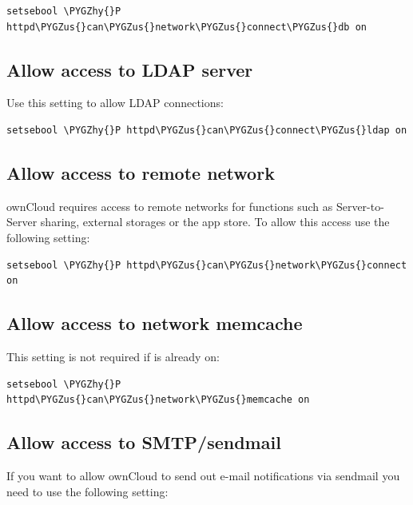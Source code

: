 \documentclass[letterpaper,10pt,english]{sphinxmanual}
\def\PYGZus{\char`\_}
\def\PYGZhy{\char`\-}
\begin{document}
\begin{Verbatim}[commandchars=\\\{\}]
setsebool \PYGZhy{}P httpd\PYGZus{}can\PYGZus{}network\PYGZus{}connect\PYGZus{}db on
\end{Verbatim}


\subsection{Allow access to LDAP server}
\label{installation/selinux_configuration:allow-access-to-ldap-server}
Use this setting to allow LDAP connections:

\begin{Verbatim}[commandchars=\\\{\}]
setsebool \PYGZhy{}P httpd\PYGZus{}can\PYGZus{}connect\PYGZus{}ldap on
\end{Verbatim}


\subsection{Allow access to remote network}
\label{installation/selinux_configuration:allow-access-to-remote-network}
ownCloud requires access to remote networks for functions such as Server-to-Server sharing, external storages or
the app store. To allow this access use the following setting:

\begin{Verbatim}[commandchars=\\\{\}]
setsebool \PYGZhy{}P httpd\PYGZus{}can\PYGZus{}network\PYGZus{}connect on
\end{Verbatim}


\subsection{Allow access to network memcache}
\label{installation/selinux_configuration:allow-access-to-network-memcache}
This setting is not required if  is already on:

\begin{Verbatim}[commandchars=\\\{\}]
setsebool \PYGZhy{}P httpd\PYGZus{}can\PYGZus{}network\PYGZus{}memcache on
\end{Verbatim}


\subsection{Allow access to SMTP/sendmail}
\label{installation/selinux_configuration:allow-access-to-smtp-sendmail}
If you want to allow ownCloud to send out e-mail notifications via sendmail you need
to use the following setting:
\end{document}

